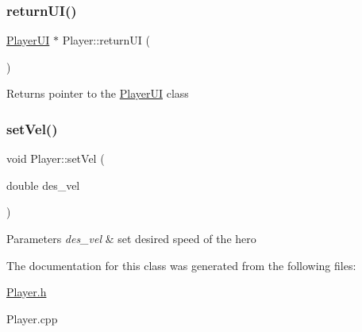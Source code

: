 \subsubsection{\texorpdfstring{return\+U\+I()}{returnUI()}}
{\footnotesize\ttfamily \hyperlink{class_player_u_i}{Player\+UI} $\ast$ Player\+::return\+UI (\begin{DoxyParamCaption}{ }\end{DoxyParamCaption})}

\begin{DoxyReturn}{Returns}
pointer to the \hyperlink{class_player_u_i}{Player\+UI} class 
\end{DoxyReturn}
\mbox{\label{class_player_ade0e4463e66975e549986ce55cac9467}} 
\subsubsection{\texorpdfstring{set\+Vel()}{setVel()}}
{\footnotesize\ttfamily void Player\+::set\+Vel (\begin{DoxyParamCaption}\item[{double}]{des\+\_\+vel }\end{DoxyParamCaption})}


\begin{DoxyParams}{Parameters}
{\em des\+\_\+vel} & set desired speed of the hero \\
\hline
\end{DoxyParams}


The documentation for this class was generated from the following files\+:\begin{DoxyCompactItemize}
\item 
\hyperlink{_player_8h}{Player.\+h}\item 
Player.\+cpp\end{DoxyCompactItemize}
